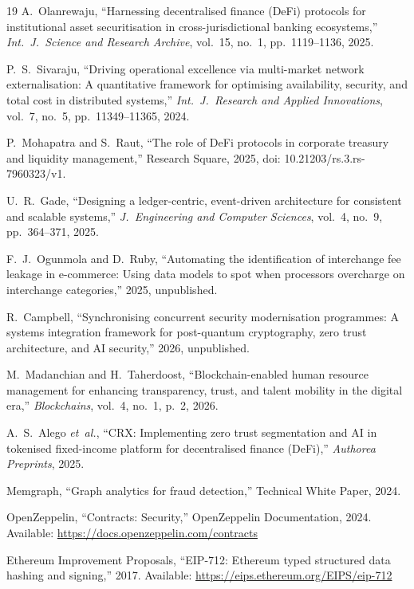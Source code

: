 \documentclass[journal]{IEEEtran}
\begin{document}
\begin{thebibliography}{19}
A.~Olanrewaju, ``Harnessing decentralised finance (DeFi) protocols for institutional asset securitisation in cross-jurisdictional banking ecosystems,'' \textit{Int.\ J.\ Science and Research Archive}, vol.~15, no.~1, pp.~1119--1136, 2025.

P.~S.~Sivaraju, ``Driving operational excellence via multi-market network externalisation: A quantitative framework for optimising availability, security, and total cost in distributed systems,'' \textit{Int.\ J.\ Research and Applied Innovations}, vol.~7, no.~5, pp.~11349--11365, 2024.

P.~Mohapatra and S.~Raut, ``The role of DeFi protocols in corporate treasury and liquidity management,'' Research Square, 2025, doi: 10.21203/rs.3.rs-7960323/v1.

U.~R.~Gade, ``Designing a ledger-centric, event-driven architecture for consistent and scalable systems,'' \textit{J.\ Engineering and Computer Sciences}, vol.~4, no.~9, pp.~364--371, 2025.

F.~J.~Ogunmola and D.~Ruby, ``Automating the identification of interchange fee leakage in e-commerce: Using data models to spot when processors overcharge on interchange categories,'' 2025, unpublished.

R.~Campbell, ``Synchronising concurrent security modernisation programmes: A systems integration framework for post-quantum cryptography, zero trust architecture, and AI security,'' 2026, unpublished.

M.~Madanchian and H.~Taherdoost, ``Blockchain-enabled human resource management for enhancing transparency, trust, and talent mobility in the digital era,'' \textit{Blockchains}, vol.~4, no.~1, p.~2, 2026.

A.~S.~Alego \textit{et~al.}, ``CRX: Implementing zero trust segmentation and AI in tokenised fixed-income platform for decentralised finance (DeFi),'' \textit{Authorea Preprints}, 2025.

Memgraph, ``Graph analytics for fraud detection,'' Technical White Paper, 2024.

OpenZeppelin, ``Contracts: Security,'' OpenZeppelin Documentation, 2024. Available: \url{https://docs.openzeppelin.com/contracts}

Ethereum Improvement Proposals, ``EIP-712: Ethereum typed structured data hashing and signing,'' 2017. Available: \url{https://eips.ethereum.org/EIPS/eip-712}

\end{thebibliography}
\end{document}
